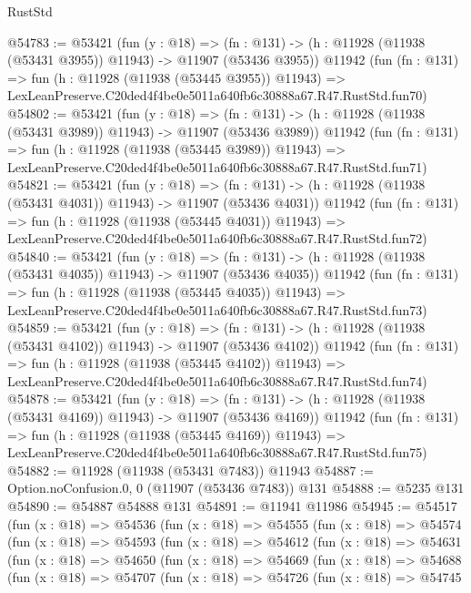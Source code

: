\begin{lexlean}{RustStd}
\begin{coremodule}
@54783 := @53421
    (fun (y : @18) =>
    (fn : @131) -> (h : @11928 (@11938 (@53431 @3955)) @11943) -> @11907 (@53436 @3955))
    @11942
    (fun (fn : @131) =>
    fun (h : @11928 (@11938 (@53445 @3955)) @11943) =>
    LexLeanPreserve.C20ded4f4be0e5011a640fb6c30888a67.R47.RustStd.fun70)
@54802 := @53421
    (fun (y : @18) =>
    (fn : @131) -> (h : @11928 (@11938 (@53431 @3989)) @11943) -> @11907 (@53436 @3989))
    @11942
    (fun (fn : @131) =>
    fun (h : @11928 (@11938 (@53445 @3989)) @11943) =>
    LexLeanPreserve.C20ded4f4be0e5011a640fb6c30888a67.R47.RustStd.fun71)
@54821 := @53421
    (fun (y : @18) =>
    (fn : @131) -> (h : @11928 (@11938 (@53431 @4031)) @11943) -> @11907 (@53436 @4031))
    @11942
    (fun (fn : @131) =>
    fun (h : @11928 (@11938 (@53445 @4031)) @11943) =>
    LexLeanPreserve.C20ded4f4be0e5011a640fb6c30888a67.R47.RustStd.fun72)
@54840 := @53421
    (fun (y : @18) =>
    (fn : @131) -> (h : @11928 (@11938 (@53431 @4035)) @11943) -> @11907 (@53436 @4035))
    @11942
    (fun (fn : @131) =>
    fun (h : @11928 (@11938 (@53445 @4035)) @11943) =>
    LexLeanPreserve.C20ded4f4be0e5011a640fb6c30888a67.R47.RustStd.fun73)
@54859 := @53421
    (fun (y : @18) =>
    (fn : @131) -> (h : @11928 (@11938 (@53431 @4102)) @11943) -> @11907 (@53436 @4102))
    @11942
    (fun (fn : @131) =>
    fun (h : @11928 (@11938 (@53445 @4102)) @11943) =>
    LexLeanPreserve.C20ded4f4be0e5011a640fb6c30888a67.R47.RustStd.fun74)
@54878 := @53421
    (fun (y : @18) =>
    (fn : @131) -> (h : @11928 (@11938 (@53431 @4169)) @11943) -> @11907 (@53436 @4169))
    @11942
    (fun (fn : @131) =>
    fun (h : @11928 (@11938 (@53445 @4169)) @11943) =>
    LexLeanPreserve.C20ded4f4be0e5011a640fb6c30888a67.R47.RustStd.fun75)
@54882 := @11928 (@11938 (@53431 @7483)) @11943
@54887 := Option.noConfusion.{0, 0} (@11907 (@53436 @7483)) @131
@54888 := @5235 @131
@54890 := @54887 @54888 @131
@54891 := @11941 @11986
@54945 := @54517
    (fun (x : @18) =>
    @54536
      (fun (x : @18) =>
      @54555
        (fun (x : @18) =>
        @54574
          (fun (x : @18) =>
          @54593
            (fun (x : @18) =>
            @54612
              (fun (x : @18) =>
              @54631
                (fun (x : @18) =>
                @54650
                  (fun (x : @18) =>
                  @54669
                    (fun (x : @18) =>
                    @54688
                      (fun (x : @18) =>
                      @54707
                        (fun (x : @18) =>
                        @54726
                          (fun (x : @18) =>
                          @54745

\end{coremodule}
\end{lexlean}
